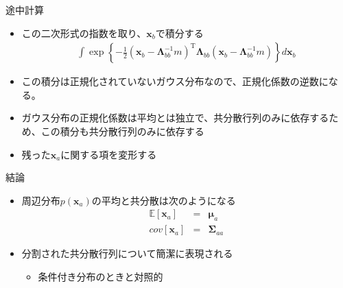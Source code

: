 \begin{frame}{途中計算}
 \begin{itemize}
  \item この二次形式の指数を取り、$\bm{x}_b$で積分する
        \begin{eqnarray}
         \int \exp\left\{-\frac{1}{2}(\bm{x}_b-\bm{\Lambda}_{bb}^{-1}m)^{\mathrm{T}}\bm{\Lambda}_{bb}(\bm{x}_b-\bm{\Lambda}_{bb}^{-1}m)\right\}d\bm{x}_b
        \end{eqnarray}
  \item この積分は正規化されていないガウス分布なので、正規化係数の逆数になる。
  \item ガウス分布の正規化係数は平均とは独立で、共分散行列のみに依存するため、この積分も共分散行列のみに依存する
  \item 残った$\bm{x}_a$に関する項を変形する
 \end{itemize}
\end{frame}

\begin{frame}{結論}
 \begin{itemize}
  \item 周辺分布$p(\bm{x}_a)$の平均と共分散は次のようになる
        \begin{eqnarray}
         \mathbb{E}[\bm{x}_a] &=&  \bm{\mu}_a\\
         cov[\bm{x}_a]&=&\bm{\Sigma}_{aa}
        \end{eqnarray}
  \item 分割された共分散行列について簡潔に表現される
        \begin{itemize}
         \item 条件付き分布のときと対照的
        \end{itemize}
 \end{itemize}
\end{frame}
